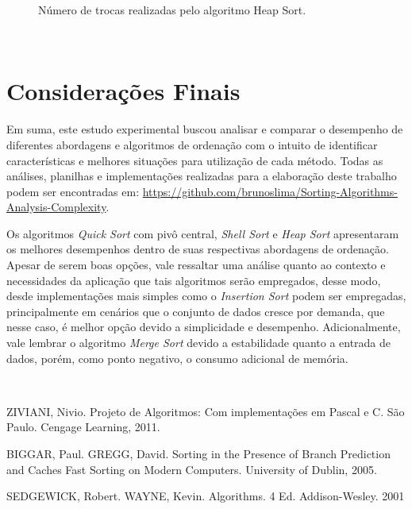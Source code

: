 \documentclass[conference,onecolumn]{IEEEtran}
\begin{document}
\begin{figure}[H]
\begin{center}
\end{center}
\caption{Número de trocas realizadas pelo algoritmo Heap Sort.}
\label{graf:heap-troca}
\end{figure}

~\\

\section{Considerações Finais}

Em suma, este estudo experimental buscou analisar e comparar o desempenho de diferentes abordagens e algoritmos de ordenação com o intuito de identificar características e melhores situações para utilização de cada método. Todas as análises, planilhas e implementações realizadas para a elaboração deste trabalho podem ser encontradas em: \url{https://github.com/brunoslima/Sorting-Algorithms-Analysis-Complexity}.

Os algoritmos \textit{Quick Sort} com pivô central, \textit{Shell Sort} e \textit{Heap Sort} apresentaram os melhores desempenhos dentro de suas respectivas abordagens de ordenação. Apesar de serem boas opções, vale ressaltar uma análise quanto ao contexto e necessidades da aplicação que tais algoritmos serão empregados, desse modo, desde implementações mais simples como o \textit{Insertion Sort} podem ser empregadas, principalmente em cenários que o conjunto de dados cresce por demanda, que nesse caso, é melhor opção devido a simplicidade e desempenho. Adicionalmente, vale lembrar o algoritmo \textit{Merge Sort} devido a estabilidade quanto a entrada de dados, porém, como ponto negativo, o consumo adicional de memória.

~\\
\begin{thebibliography}{9}

ZIVIANI, Nivio. Projeto de Algoritmos: Com implementações em Pascal e C. São Paulo. Cengage Learning, 2011.

BIGGAR, Paul. GREGG, David. Sorting in the Presence of Branch Prediction
and Caches Fast Sorting on Modern Computers. University of Dublin, 2005.

SEDGEWICK, Robert. WAYNE, Kevin. Algorithms. 4 Ed. Addison-Wesley. 2001

\end{thebibliography}

\end{document}
